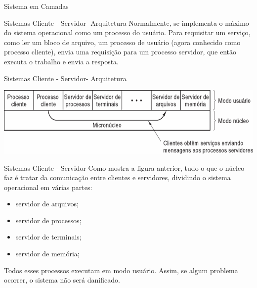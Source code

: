 \documentclass{beamer}
\begin{document}
\begin{frame}{Sistema em Camadas}
\begin{frame}{Sistemas Cliente - Servidor- Arquitetura }
    Normalmente, se implementa o máximo do sistema operacional como um processo do usuário. Para requisitar um serviço, como ler um bloco de arquivo, um processo de usuário (agora conhecido como processo cliente), envia uma requisição para um processo servidor, que então executa o trabalho e envia a resposta.
\end{frame}
\begin{frame}{Sistemas Cliente - Servidor- Arquitetura}

    \vspace{1cm}
    \begin{center}
        \includegraphics[width=0.8\linewidth]{assets/aula-tads-sope/SO-cli-ser-1.png} %
    \end{center}
\end{frame}
\begin{frame}{Sistemas Cliente - Servidor}
    Como mostra a figura anterior, tudo o que o núcleo faz é tratar da comunicação entre clientes e servidores, dividindo o sistema operacional em várias partes:

    \begin{itemize}
        \item servidor de arquivos;
        \item servidor de processos;
        \item servidor de terminais;
        \item servidor de memória;
    \end{itemize}

    Todos esses processos executam em modo usuário. Assim, se algum problema ocorrer, o sistema não será danificado.
\end{frame}


\end{frame}
\end{document}
